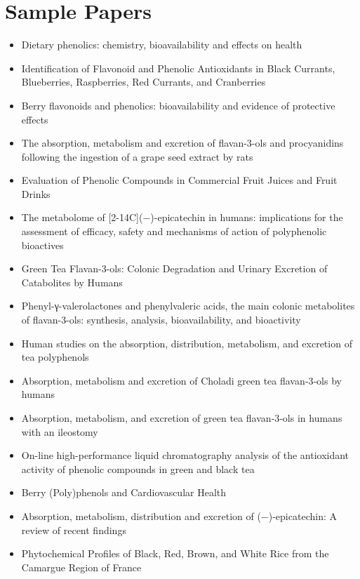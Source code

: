 \documentclass[a4paper,11pt]{article}
\begin{document}
\section*{Sample Papers}
\begin{itemize}\setlength\itemsep{2pt}
  \item Dietary phenolics: chemistry, bioavailability and effects on health
  \item Identification of Flavonoid and Phenolic Antioxidants in Black Currants, Blueberries, Raspberries, Red Currants, and Cranberries
  \item Berry flavonoids and phenolics: bioavailability and evidence of protective effects
  \item The absorption, metabolism and excretion of flavan-3-ols and procyanidins following the ingestion of a grape seed extract by rats
  \item Evaluation of Phenolic Compounds in Commercial Fruit Juices and Fruit Drinks
  \item The metabolome of [2-14C](−)-epicatechin in humans: implications for the assessment of efficacy, safety and mechanisms of action of polyphenolic bioactives
  \item Green Tea Flavan-3-ols: Colonic Degradation and Urinary Excretion of Catabolites by Humans
  \item Phenyl-γ-valerolactones and phenylvaleric acids, the main colonic metabolites of flavan-3-ols: synthesis, analysis, bioavailability, and bioactivity
  \item Human studies on the absorption, distribution, metabolism, and excretion of tea polyphenols
  \item Absorption, metabolism and excretion of Choladi green tea flavan‐3‐ols by humans
  \item Absorption, metabolism, and excretion of green tea flavan‐3‐ols in humans with an ileostomy
  \item On-line high-performance liquid chromatography analysis of the antioxidant activity of phenolic compounds in green and black tea
  \item Berry (Poly)phenols and Cardiovascular Health
  \item Absorption, metabolism, distribution and excretion of (−)-epicatechin: A review of recent findings
  \item Phytochemical Profiles of Black, Red, Brown, and White Rice from the Camargue Region of France
\end{itemize}
\end{document}
